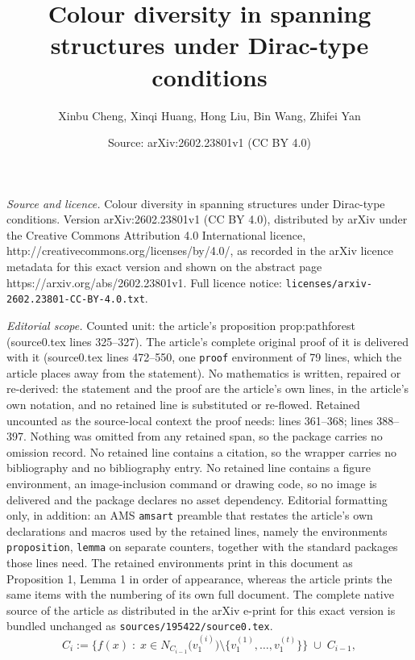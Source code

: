 \documentclass[10pt,a4paper]{amsart}
\title{Colour diversity in spanning structures under Dirac-type conditions}
\author{Xinbu Cheng, Xinqi Huang, Hong Liu, Bin Wang, Zhifei Yan}
\date{Source: arXiv:2602.23801v1 (CC BY 4.0)}
\begin{document}
\maketitle

\noindent\emph{Source and licence.} Colour diversity in spanning structures under Dirac-type conditions. Version arXiv:2602.23801v1 (CC BY 4.0), distributed by arXiv under the Creative Commons Attribution 4.0 International licence, http://creativecommons.org/licenses/by/4.0/, as recorded in the arXiv licence metadata for this exact version and shown on the abstract page https://arxiv.org/abs/2602.23801v1. Full licence notice: \texttt{licenses/arxiv-2602.23801-CC-BY-4.0.txt}.\par\smallskip

\noindent\textit{Editorial scope.} Counted unit: the article's proposition prop:pathforest (source0.tex lines 325--327). The article's complete original proof of it is delivered with it (source0.tex lines 472--550, one \texttt{proof} environment of 79 lines, which the article places away from the statement). No mathematics is written, repaired or re-derived: the statement and the proof are the article's own lines, in the article's own notation, and no retained line is substituted or re-flowed.  Retained uncounted as the source-local context the proof needs: lines 361--368; lines 388--397.  Nothing was omitted from any retained span, so the package carries no omission record.  No retained line contains a citation, so the wrapper carries no bibliography and no bibliography entry.  No retained line contains a figure environment, an image-inclusion command or drawing code, so no image is delivered and the package declares no asset dependency.  Editorial formatting only, in addition: an AMS \texttt{amsart} preamble that restates the article's own declarations and macros used by the retained lines, namely the environments \texttt{proposition}, \texttt{lemma} on separate counters, together with the standard packages those lines need.  The retained environments print in this document as Proposition 1, Lemma 1 in order of appearance, whereas the article prints the same items with the numbering of its own full document.  The complete native source of the article as distributed in the arXiv e-print for this exact version is bundled unchanged as \texttt{sources/195422/source0.tex}.
\begin{equation}\label{eq:colourset}
C_i :=
\Big\{ f(x)\;:\;
x\in N_{C_{i-1}}\!\big(v_1^{(i)}\big)
      \setminus \{v_1^{(1)},\ldots,v_1^{(t)}\}
\Big\}
\;\cup\; C_{i-1},
\end{equation}
\end{document}
